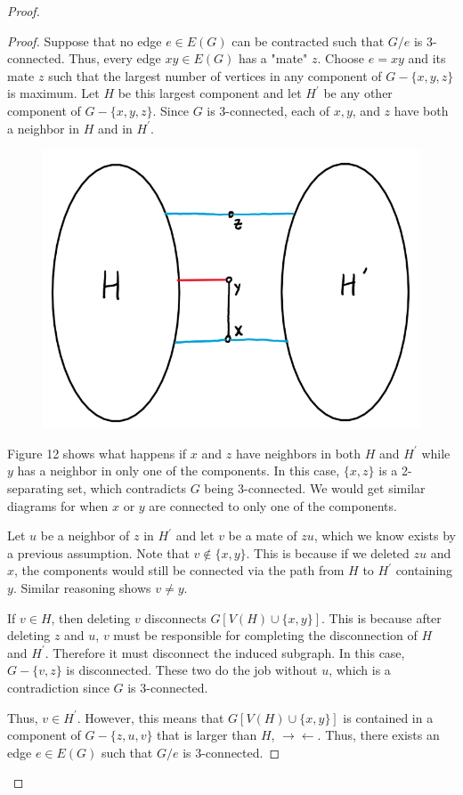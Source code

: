 \documentclass[12pt]{article}
\theoremstyle{definition}
\begin{document}
\begin{proof}
\begin{proof}
            Suppose that no edge $e \in E(G)$ can be contracted such that $G / e$ is 3-connected. Thus, every edge $xy \in E(G)$ has a "mate" $z$. Choose $e = xy$ and its mate $z$ such that the largest number of vertices in any component of $G - \{x,y,z\}$ is maximum. Let $H$ be this largest component and let $H^{\prime}$ be any other component of $G - \{x,y,z\}$. Since $G$ is 3-connected, each of $x,y$, and $z$ have both a neighbor in $H$ and in $H^{\prime}$.
            \begin{figure}[hbt!]
                \centering
                \includegraphics[width=0.40\linewidth]{graphs/claim_6.png}
                \caption{}
            \end{figure}

            Figure 12 shows what happens if $x$ and $z$ have neighbors in both $H$ and $H^{\prime}$ while $y$ has a neighbor in only one of the components. In this case, $\{x,z\}$ is a 2-separating set, which contradicts $G$ being 3-connected. We would get similar diagrams for when $x$ or $y$ are connected to only one of the components.

            Let $u$ be a neighbor of $z$ in $H^{\prime}$ and let $v$ be a mate of $zu$, which we know exists by a previous assumption. Note that $v \not \in \{x,y\}$. This is because if we deleted $zu$ and $x$, the components would still be connected via the path from $H$ to $H^{\prime}$ containing $y$. Similar reasoning shows $v \not  = y$.

            If $v \in H$, then deleting $v$ disconnects $G[V(H) \cup \{x,y\}]$. This is because after deleting $z$ and $u$, $v$ must be responsible for completing the disconnection of $H$ and $H^{\prime}$. Therefore it must disconnect the induced subgraph. In this case, $G - \{v,z\}$ is disconnected. These two do the job without $u$, which is a contradiction since $G$ is 3-connected.

            Thus, $v \in H^{\prime}$. However, this means that $G[V(H) \cup \{x,y\}]$ is contained in a component of $G - \{z,u,v\}$ that is larger than $H$, $\rightarrow \leftarrow$. Thus, there exists an edge $e \in E(G)$ such that $G / e$ is 3-connected.
    \end{proof}


\end{proof}
\end{document}
